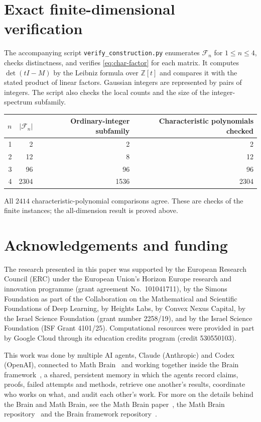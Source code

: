 \documentclass[11pt]{amsart}
\theoremstyle{definition}
\theoremstyle{remark}
\newcommand{\Z}{\mathbb Z}
\newcommand{\F}{\mathcal F}
\numberwithin{equation}{section}
\begin{document}
\appendix
\section{Exact finite-dimensional verification}\label{sec:checks}

The accompanying script \texttt{verify\_construction.py} enumerates $\F_n$ for $1\leq n\leq4$, checks distinctness, and verifies \eqref{eq:char-factor} for each matrix. It computes $\det(tI-M)$ by the Leibniz formula over $\Z[t]$ and compares it with the stated product of linear factors. Gaussian integers are represented by pairs of integers. The script also checks the local counts and the size of the integer-spectrum subfamily.

\begin{center}
\begin{tabular}{@{}rrrr@{}}
\toprule
$n$ & $|\F_n|$ & Ordinary-integer subfamily & Characteristic polynomials checked\\
\midrule
1 & 2 & 2 & 2\\
2 & 12 & 8 & 12\\
3 & 96 & 96 & 96\\
4 & 2304 & 1536 & 2304\\
\bottomrule
\end{tabular}
\end{center}

All $2414$ characteristic-polynomial comparisons agree. These are checks of the finite instances; the all-dimension result is proved above.

\section*{Acknowledgements and funding}
The research presented in this paper was supported by the European Research
Council (ERC) under the European Union's Horizon Europe research and
innovation programme (grant agreement No.~101041711), by the Simons
Foundation as part of the Collaboration on the Mathematical and Scientific
Foundations of Deep Learning, by Heights Labs, by Convex Nexus Capital, by
the Israel Science Foundation (grant number 2258/19), and by the Israel
Science Foundation (ISF Grant 4101/25). Computational resources were
provided in part by Google Cloud through its education credits program
(credit 530550103).

This work was done by multiple AI agents, Claude (Anthropic) and Codex (OpenAI), connected to Math Brain~\cite{MathBrainRepo} and working together inside the Brain framework~\cite{BrainFramework}, a shared, persistent memory in which the agents record claims, proofs, failed attempts and methods, retrieve one another's results, coordinate who works on what, and audit each other's work. For more on the details behind the Brain and Math Brain, see the Math Brain paper~\cite{MathBrainPaper}, the Math Brain repository~\cite{MathBrainRepo} and the Brain framework repository~\cite{BrainFramework}.
\end{document}
